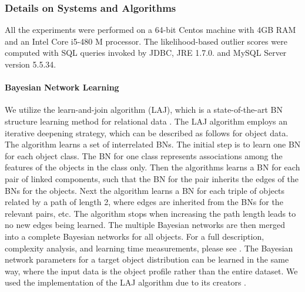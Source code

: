 \documentclass[conference]{IEEEtran}
\begin{document}
								\subsubsection{Details on Systems and Algorithms} 
\label{sec:details}
All the experiments were performed on a 64-bit Centos machine with 4GB RAM and an Intel Core i5-480 M processor. The likelihood-based outlier scores were computed with SQL queries invoked by JDBC, JRE 1.7.0. and MySQL Server version 5.5.34.


\paragraph{Bayesian Network Learning}
				\label{sec:bnlearning}
				
				We utilize the learn-and-join algorithm (LAJ), which is
				a state-of-the-art BN structure learning method for relational data \cite{Schulte2012}. The LAJ algorithm employs an iterative deepening strategy, which can be described as follows for object data. The algorithm learns a set of interrelated BNs. The initial step is to learn one BN for each object class. The BN for one class represents associations among the features of the objects in the class only. Then the algorithms learns a BN for each pair of linked components, such that the BN for the pair inherits the edges of the BNs for the objects. Next the algorithm learns a BN for each triple of  objects related by a path of length 2, where edges are inherited from the BNs for the relevant pairs, etc. The algorithm stops when increasing the path length leads to no new edges being learned. The multiple Bayesian networks are then merged into a complete Bayesian networks for all objects. For a full description, complexity analysis, and learning time measurements, please see \cite{Schulte2012}. 
				The Bayesian network parameters for a target object distribution can be learned in the same way, where the input data is the object profile rather than the entire dataset. 
				We used the implementation of the LAJ algorithm due to its creators \cite{bib:jbnsite}. 
\end{document}
